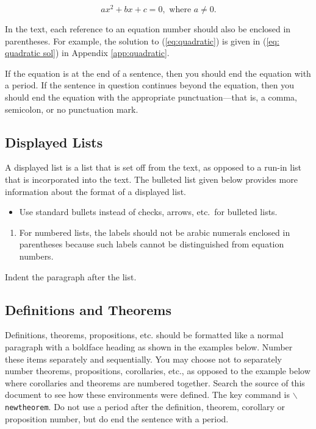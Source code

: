 \documentclass{wscpaperproc}
\theoremstyle{wsc}
\begin{document}
\begin{equation} \label{eq:quadratic}
ax^2 + bx + c = 0, \mbox{ where } a \ne 0.
\end{equation}

In the text, each reference to an equation number should also be enclosed in parentheses. For example, the solution to (\ref{eq:quadratic}) is given in (\ref{eq: quadratic sol}) in Appendix \ref{app:quadratic}.

If the equation is at the end of a sentence, then you should end the equation with a period. If the sentence in question continues beyond the equation, then you should end the equation with the appropriate punctuation---that is, a comma, semicolon, or no punctuation mark.

\subsection{Displayed Lists}
A displayed list is a list that is set off from the text, as opposed to a run-in list that is incorporated into the text. The bulleted list given below provides more information about the format of a displayed list.

\begin{itemize}
	\item Use standard bullets instead of checks, arrows, etc.\ for bulleted lists.
\end{itemize}
\begin{enumerate}
	\item For numbered lists, the labels should not be arabic numerals enclosed in parentheses because such labels cannot be distinguished from equation numbers.
\end{enumerate}

Indent the paragraph after the list.


\subsection{Definitions and Theorems}
Definitions, theorems, propositions, etc. should be formatted like a normal paragraph with a boldface heading as shown in the examples below. Number
these items separately and sequentially. You may choose not to separately number theorems, propositions, corollaries, etc., as opposed to the example below where corollaries and theorems are numbered together. Search the source of this document to see how these environments were defined. The key
command is {\tt $\backslash$newtheorem}. Do not use a period after the definition, theorem, corollary or proposition number, but do end the sentence with a period.
\end{document}
